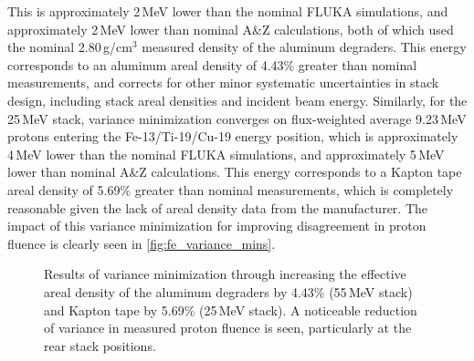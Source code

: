 This is approximately 2\,MeV lower than the nominal FLUKA simulations, and approximately 2\,MeV lower than nominal A\&Z calculations, both of which used the nominal 2.80\,g/cm$^3$ measured density of the  aluminum degraders.
This energy corresponds to an aluminum areal density of 4.43\% greater than nominal measurements, and 
corrects for other minor systematic uncertainties in stack design, including stack areal densities and incident beam energy.
Similarly, for the 25\,MeV stack, variance minimization converges on  flux-weighted average 9.23\,MeV protons entering the Fe-13/Ti-19/Cu-19 energy position, which is approximately 4\,MeV lower than the nominal FLUKA simulations, and approximately 5\,MeV lower than nominal A\&Z calculations.
This energy corresponds to a Kapton tape areal density of 5.69\% greater than nominal measurements, which is completely reasonable given the lack of areal density data from the manufacturer.
The impact of this variance minimization for improving disagreement in proton fluence is  clearly  seen in   \autoref{fig:fe_variance_mins}.




\begin{figure}
    \centering
    \caption{Results of variance minimization through increasing the effective areal density of the  aluminum degraders by 4.43\% (55\,MeV stack) and Kapton tape by 5.69\% (25\,MeV stack). A noticeable reduction of variance in measured proton fluence is seen,  particularly at the  rear stack positions.} 
     \label{fig:fe_variance_mins}
\end{figure}



